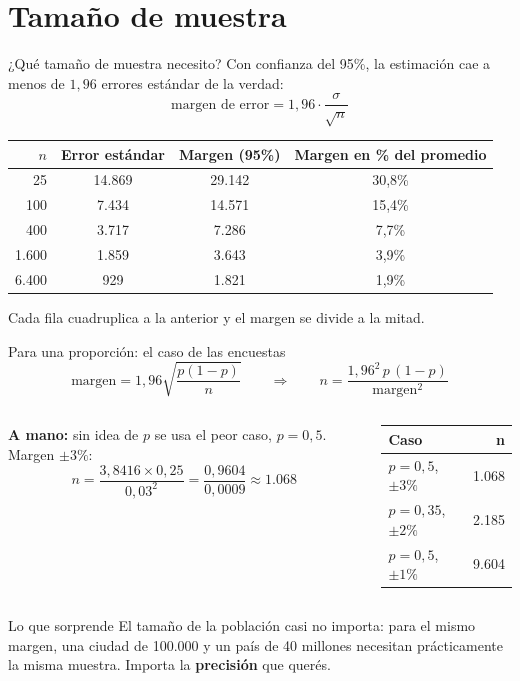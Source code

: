 \documentclass[aspectratio=169,10pt]{beamer}
\begin{document}
\section{Tamaño de muestra}

\begin{frame}{¿Qué tamaño de muestra necesito?}
Con confianza del 95\%, la estimación cae a menos de $1{,}96$ errores estándar de la verdad:
\[
\text{margen de error} = 1{,}96 \cdot \frac{\sigma}{\sqrt{n}}
\]
\begin{center}
\small
\begin{tabular}{rccc}
\toprule
$n$ & \textbf{Error estándar} & \textbf{Margen (95\%)} & \textbf{Margen en \% del promedio} \\
\midrule
25 & 14.869 & 29.142 & 30,8\% \\
100 & 7.434 & 14.571 & 15,4\% \\
400 & 3.717 & 7.286 & 7,7\% \\
1.600 & 1.859 & 3.643 & 3,9\% \\
6.400 & 929 & 1.821 & 1,9\% \\
\bottomrule
\end{tabular}
\end{center}
Cada fila cuadruplica a la anterior y el margen se divide a la mitad.
\end{frame}

\begin{frame}{Para una proporción: el caso de las encuestas}
\[
\text{margen} = 1{,}96\sqrt{\frac{p(1-p)}{n}}
\qquad\Longrightarrow\qquad
n = \frac{1{,}96^2\, p\,(1-p)}{\text{margen}^2}
\]
\begin{columns}[T]
\textbf{A mano:} sin idea de $p$ se usa el peor caso, $p = 0{,}5$. Margen $\pm 3\%$:
\[
n = \frac{3{,}8416 \times 0{,}25}{0{,}03^2} = \frac{0{,}9604}{0{,}0009} \approx 1.068
\]
\begin{center}
\small
\begin{tabular}{lr}
\toprule
\textbf{Caso} & \textbf{n} \\
\midrule
$p=0{,}5$, $\pm 3\%$ & 1.068 \\
$p=0{,}35$, $\pm 2\%$ & 2.185 \\
$p=0{,}5$, $\pm 1\%$ & 9.604 \\
\bottomrule
\end{tabular}
\end{center}
\end{columns}
\vspace{0.2cm}
\begin{alertblock}{Lo que sorprende}
El tamaño de la población casi no importa: para el mismo margen, una ciudad de 100.000 y un país de 40 millones necesitan prácticamente la misma muestra. Importa la \textbf{precisión} que querés.
\end{alertblock}
\end{frame}
\end{document}
